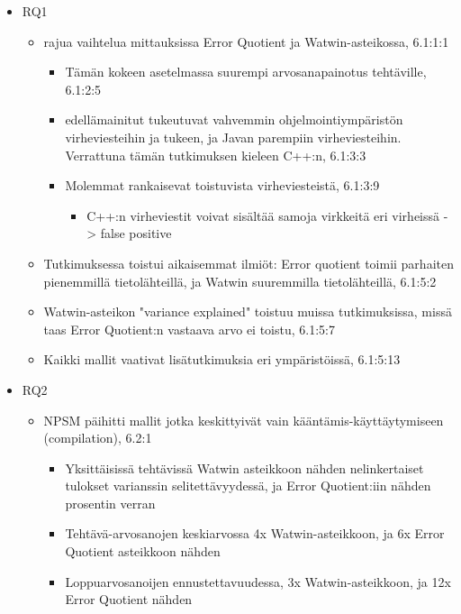 \begin{itemize}
    \item RQ1
        \begin{itemize}
            \item rajua vaihtelua mittauksissa Error Quotient ja Watwin-asteikossa, 6.1:1:1
            \begin{itemize}
                \item Tämän kokeen asetelmassa suurempi arvosanapainotus tehtäville, 6.1:2:5
                \item edellämainitut tukeutuvat vahvemmin ohjelmointiympäristön virheviesteihin ja tukeen, ja Javan parempiin virheviesteihin. Verrattuna tämän tutkimuksen kieleen C++:n, 6.1:3:3
                \item Molemmat rankaisevat toistuvista virheviesteistä, 6.1:3:9
                \begin{itemize}
                    \item C++:n virheviestit voivat sisältää samoja virkkeitä eri virheissä -> false positive
                \end{itemize}
            \end{itemize}
            \item Tutkimuksessa toistui aikaisemmat ilmiöt: Error quotient toimii parhaiten pienemmillä tietolähteillä, ja Watwin suuremmilla tietolähteillä, 6.1:5:2
            \item Watwin-asteikon "variance explained" toistuu muissa tutkimuksissa, missä taas Error Quotient:n vastaava arvo ei toistu, 6.1:5:7
            \item Kaikki mallit vaativat lisätutkimuksia eri ympäristöissä, 6.1:5:13
        \end{itemize}
    \item RQ2
    \begin{itemize}
        \item NPSM päihitti mallit jotka keskittyivät vain kääntämis-käyttäytymiseen (compilation), 6.2:1
        \begin{itemize}
            \item Yksittäisissä tehtävissä Watwin asteikkoon nähden nelinkertaiset tulokset varianssin selitettävyydessä, ja Error Quotient:iin nähden prosentin verran
            \item Tehtävä-arvosanojen keskiarvossa 4x Watwin-asteikkoon, ja 6x Error Quotient asteikkoon nähden
            \item Loppuarvosanoijen ennustettavuudessa, 3x Watwin-asteikkoon, ja 12x Error Quotient nähden

\end{itemize}
\end{itemize}
\end{itemize}
